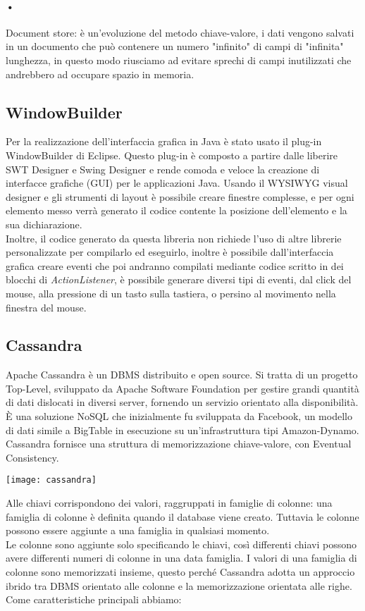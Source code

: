 \paragraph{•}Document store: è un'evoluzione del metodo chiave-valore, i dati vengono salvati in un documento che può contenere un numero "infinito" di campi di "infinita" lunghezza, in questo modo riusciamo ad evitare sprechi di campi inutilizzati che andrebbero ad occupare spazio in memoria.

\subsection{WindowBuilder}
\hspace{\parindent}Per la realizzazione dell'interfaccia grafica in Java è stato usato il plug-in WindowBuilder di Eclipse. Questo plug-in è composto a partire dalle liberire SWT Designer e Swing Designer e rende comoda e veloce la creazione di interfacce grafiche (GUI) per le applicazioni Java. Usando il WYSIWYG visual designer e gli strumenti di layout è possibile creare finestre complesse, e per ogni elemento messo verrà generato il codice contente la posizione dell'elemento e la sua dichiarazione.
\\Inoltre, il codice generato da questa libreria non richiede l'uso di altre librerie personalizzate per compilarlo ed eseguirlo, inoltre è possibile dall'interfaccia grafica creare eventi che poi andranno compilati mediante codice scritto in dei blocchi di \textit{ActionListener}, è possibile generare diversi tipi di eventi, dal click del mouse, alla pressione di un tasto sulla tastiera, o persino al movimento nella finestra del mouse.

\subsection{Cassandra}
\hspace{\parindent}Apache Cassandra è un DBMS distribuito e open source. Si tratta di un progetto Top-Level, sviluppato da Apache Software Foundation per gestire grandi quantità di dati dislocati in diversi server, fornendo un servizio orientato alla disponibilità.
\\È una soluzione NoSQL che inizialmente fu sviluppata da Facebook, un modello di dati simile a BigTable in esecuzione su un'infrastruttura tipi Amazon-Dynamo. Cassandra fornisce una struttura di memorizzazione chiave-valore, con Eventual Consistency.
\begin{center}
\texttt{[image: cassandra]}
\end{center}
Alle chiavi corrispondono dei valori, raggruppati in famiglie di colonne: una famiglia di colonne è definita quando il database viene creato. Tuttavia le colonne possono essere aggiunte a una famiglia in qualsiasi momento.
\\Le colonne sono aggiunte solo specificando le chiavi, così differenti chiavi possono avere differenti numeri di colonne in una data famiglia. I valori di una famiglia di colonne sono memorizzati insieme, questo perché Cassandra adotta un approccio ibrido tra DBMS orientato alle colonne e la memorizzazione orientata alle righe.
\\Come caratteristiche principali abbiamo:
